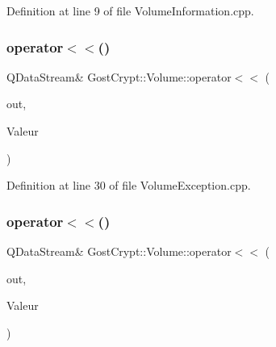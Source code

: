Definition at line 9 of file Volume\+Information.\+cpp.

\mbox{\label{namespace_gost_crypt_1_1_volume_aef96897fc1bff67356931452f10836ee}} 
\subsubsection{\texorpdfstring{operator$<$$<$()}{operator<<()}\hspace{0.1cm}{\footnotesize\ttfamily [2/19]}}
{\footnotesize\ttfamily Q\+Data\+Stream\& Gost\+Crypt\+::\+Volume\+::operator$<$$<$ (\begin{DoxyParamCaption}\item[{Q\+Data\+Stream \&}]{out,  }\item[{const \hyperlink{class_gost_crypt_1_1_volume_1_1_volume_exception}{Gost\+Crypt\+::\+Volume\+::\+Volume\+Exception} \&}]{Valeur }\end{DoxyParamCaption})}



Definition at line 30 of file Volume\+Exception.\+cpp.

\mbox{\label{namespace_gost_crypt_1_1_volume_a912aa6924eaa4043d75757d916f327b4}} 
\subsubsection{\texorpdfstring{operator$<$$<$()}{operator<<()}\hspace{0.1cm}{\footnotesize\ttfamily [3/19]}}
{\footnotesize\ttfamily Q\+Data\+Stream\& Gost\+Crypt\+::\+Volume\+::operator$<$$<$ (\begin{DoxyParamCaption}\item[{Q\+Data\+Stream \&}]{out,  }\item[{const \hyperlink{class_gost_crypt_1_1_volume_1_1_encryption_test_failed}{Gost\+Crypt\+::\+Volume\+::\+Encryption\+Test\+Failed} \&}]{Valeur }\end{DoxyParamCaption})}



